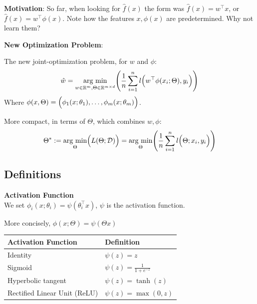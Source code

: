 \textbf{Motivation}: So far, when looking for $\hat{f}(x)$ the form was $\hat{f}(x)=w^\top x$, or $\hat{f}(x) = w^\top \phi(x)$. 
Note how the features $x, \phi(x)$ are predetermined. Why not learn them?

\textbf{New Optimization Problem}:

The new joint-optimization problem, for $w$ and $\phi$:\\
$$
    \hat{w} = \underset{w\in\mathbb{R}^m,\Theta\in\mathbb{R}^{m\times d}}{\text{arg min}}\Biggl( \frac{1}{n}\sum_{i=1}^n l\Bigl( w^\top \phi(x_i;\Theta),y_i \Bigr) \Biggr)
$$
Where $\phi(x,\Theta) = \Bigl( \phi_1(x;\theta_1),\ldots,\phi_m(x;\theta_m) \Bigr)$.\\

More compact, in terms of $\Theta$, which combines $w, \phi$:
$$
    \Theta^* := \underset{\Theta}{\text{arg min}}\Bigl( L(\Theta; \mathcal{D}) \Bigr) = \underset{\Theta}{\text{arg min}} \Biggl( \frac{1}{n} \sum_{i=1}^{n} l\Bigl( \Theta;x_i,y_i \Bigr) \Biggr)
$$

\subsection{Definitions}

 \textbf{Activation Function}\\
We set $\phi_i(x;\theta_i) = \psi(\theta_i^\top x)$, $\psi$ is the activation function.\\

{\footnotesize
    \notation More concisely, $\phi(x;\Theta) = \psi(\Theta x)$
}

\begin{center}
    \begin{tabular}{ll}
        \textbf{Activation Function}    & \textbf{Definition}               \\
        \hline
        Identity                        & $\psi(z) = z$                     \\
        Sigmoid                         & $\psi(z) = \frac{1}{1+e^{-z}}$    \\
        Hyperbolic tangent              & $\psi(z) = \tanh(z)$              \\
        Rectified Linear Unit (ReLU)    & $\psi(z) = \max(0,z)$ 
    \end{tabular}
\end{center}

